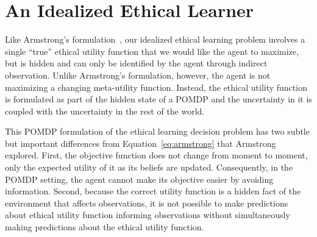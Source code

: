 \documentclass[11pt]{article}
\newcommand\davenote[1]{\textcolor{blue}{Dave: #1}}
\begin{document}

\section{An Idealized Ethical Learner}
Like Armstrong's formulation~, our idealized ethical learning problem involves a single ``true'' ethical utility function that we would like the agent to maximize, but is hidden and can only be identified by the agent through indirect observation. Unlike Armstrong's formulation, however, the agent is not maximizing a changing meta-utility function. Instead, the ethical utility function is formulated as part of the hidden state of a POMDP and the uncertainty in it is coupled with the uncertainty in the rest of the world.

This POMDP formulation of the ethical learning decision problem has two subtle but important differences from Equation~\ref{eq:armstrong} that Armstrong explored. First, the objective function does not change from moment to moment, only the expected utility of it as its beliefs are updated. Consequently, in the POMDP setting, the agent cannot make its objective easier by avoiding information. Second, because the correct utility function is a hidden fact of the environment that affects observations, it is not possible to make predictions about ethical utility function informing observations without simultaneously making predictions about the ethical utility function.
\end{document}
